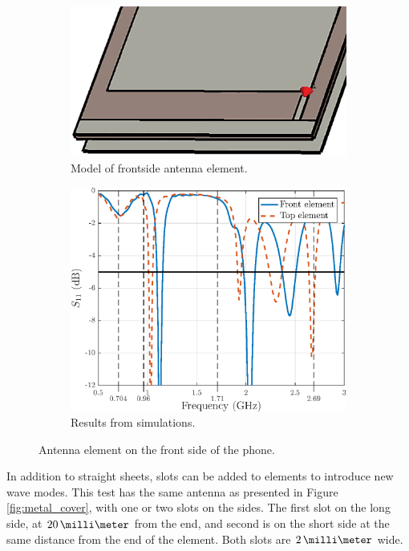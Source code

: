 \begin{figure}[H]
    \centering
    \begin{subfigure}[b]{0.49\textwidth}
        \includegraphics[width=\textwidth]{img/front.eps}
        \caption{Model of frontside antenna element.}
        \label{fig:front_model}
    \end{subfigure}
    \begin{subfigure}[b]{0.49\textwidth}
        \includegraphics[width=\textwidth]{img/front_res.eps}
        \caption{Results from simulations.}
        \label{fig:front_res}
    \end{subfigure}
    \caption{Antenna element on the front side of the phone.}
    \label{fig:front_elem}
\end{figure}



In addition to straight sheets, slots can be added to elements to introduce new wave modes. This test has the same antenna as presented in Figure \ref{fig:metal_cover}, with one or two slots on the sides. The first slot on the long side, at $20\,\milli\meter$ from the end, and second is on the short side at the same distance from the end of the element. Both slots are $2\,\milli\meter$ wide.

